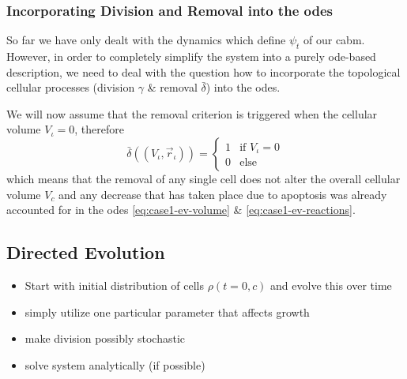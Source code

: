 
\subsubsection{Incorporating Division and Removal into the \acsp{ode}}
So far we have only dealt with the dynamics which define $\psi_t$ of our \ac{cabm}.
However, in order to completely simplify the system into a purely \ac{ode}-based description, we
need to deal with the question how to incorporate the topological cellular processes (division
$\gamma$ \& removal $\bar{\delta}$) into the \acp{ode}.

We will now assume that the removal criterion is triggered when the cellular volume $V_\iota=0$,
therefore
\begin{equation}
    \bar{\delta}((V_\iota,\vec{r}_\iota))=\begin{cases}
        1 &\text{if } V_\iota=0\\
        0 &\text{else }
    \end{cases}
\end{equation}
which means that the removal of any single cell does not alter the overall cellular volume $V_c$ and
any decrease that has taken place due to apoptosis was already accounted for in the \acp{ode}
\eqref{eq:case1-ev-volume} \& \eqref{eq:case1-ev-reactions}.



\subsection{Directed Evolution}

\begin{itemize}
    \item Start with initial distribution of cells $\rho(t=0,c)$ and evolve this over time
    \item simply utilize one particular parameter that affects growth
    \item make division possibly stochastic
    \item solve system analytically (if possible)
\end{itemize}



